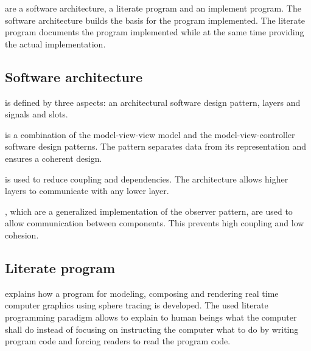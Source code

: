 \documentclass[%
    a4paper,    %
    justified,  %
    nobib,      %
    openany     %
]{tufte-book}
\makeatletter
\renewcommand{\label}[1]{\@tufte@label{##1}}%
\makeatother
\begin{document}

 are a software architecture, a literate
program and an implement program. The software architecture builds the basis for
the program implemented. The literate program documents the program implemented
while at the same time providing the actual implementation.

\subsection{Software architecture}
\label{subsec:discussion-conclusion:discussion:software-architecture}

 is defined by three aspects: an
architectural software design pattern, layers and signals and slots.

 is a combination of
the model-view-view model and the model-view-controller software design
patterns. The pattern separates data from its representation and ensures a
coherent design.

 is used to reduce coupling and
dependencies. The architecture allows higher layers to communicate with any
lower layer.

, which are a generalized implementation of the
observer pattern, are used to allow communication between components. This
prevents high coupling and low cohesion.

\subsection{Literate program}
\label{subsec:discussion-conclusion:discussion:literate-program}

 explains how a program for modeling,
composing and rendering real time computer graphics using sphere tracing is
developed. The used literate programming paradigm allows to explain to human
beings what the computer shall do instead of focusing on instructing the
computer what to do by writing program code and forcing readers to read the
program code.
\end{document}
